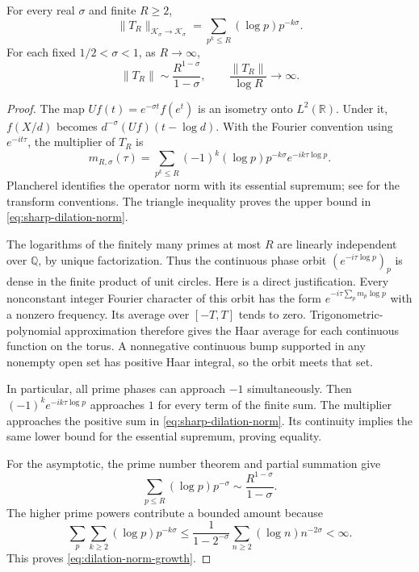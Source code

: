 \begin{theorem}\label{thm:sharp-dilation-norm}
For every real $\sigma$ and finite $R\ge2$,
\begin{equation}\label{eq:sharp-dilation-norm}
 \|T_R\|_{\mathcal K_\sigma\to\mathcal K_\sigma}
       =\sum_{p^k\le R}(\log p)p^{-k\sigma}.
\end{equation}
For each fixed $1/2<\sigma<1$, as $R\to\infty$,
\begin{equation}\label{eq:dilation-norm-growth}
 \|T_R\|\sim\frac{R^{1-\sigma}}{1-\sigma},\qquad
 \frac{\|T_R\|}{\log R}\longrightarrow\infty.
\end{equation}
\end{theorem}
\begin{proof}
The map $Uf(t)=e^{-\sigma t}f(e^t)$ is an isometry onto
$L^2(\mathbb R)$. Under it, $f(X/d)$ becomes
$d^{-\sigma}(Uf)(t-\log d)$. With the Fourier convention using
$e^{-it\tau}$, the multiplier of $T_R$ is
\[
 m_{R,\sigma}(\tau)=\sum_{p^k\le R}
 (-1)^k(\log p)p^{-k\sigma}e^{-ik\tau\log p}.
\]
Plancherel identifies the operator norm with its essential supremum;
see \cite[\S1.14]{dlmf-transforms} for the transform conventions.
The triangle inequality proves the upper bound in
\eqref{eq:sharp-dilation-norm}.

The logarithms of the finitely many primes at most $R$ are linearly
independent over $\mathbb Q$, by unique factorization. Thus the
continuous phase orbit $(e^{-i\tau\log p})_p$ is dense in the finite
product of unit circles. Here is a direct justification. Every
nonconstant integer Fourier character of this orbit has the form
$e^{-i\tau\sum_p m_p\log p}$ with a nonzero frequency. Its average
over $[-T,T]$ tends to zero. Trigonometric-polynomial approximation
therefore gives the Haar average for each continuous function on the
torus. A nonnegative continuous bump supported in any nonempty open
set has positive Haar integral, so the orbit meets that set.

In particular, all prime phases can approach $-1$ simultaneously.
Then $(-1)^ke^{-ik\tau\log p}$ approaches $1$ for every term of
the finite sum. The multiplier approaches the positive sum in
\eqref{eq:sharp-dilation-norm}. Its continuity implies the same lower
bound for the essential supremum, proving equality.

For the asymptotic, the prime number theorem
\cite[\S27.12]{dlmf-primes} and partial summation give
\[
 \sum_{p\le R}(\log p)p^{-\sigma}
       \sim\frac{R^{1-\sigma}}{1-\sigma}.
\]
The higher prime powers contribute a bounded amount because
\[
 \sum_p\sum_{k\ge2}(\log p)p^{-k\sigma}
 \le\frac1{1-2^{-\sigma}}
             \sum_{n\ge2}(\log n)n^{-2\sigma}<\infty.
\]
This proves \eqref{eq:dilation-norm-growth}.
\end{proof}

